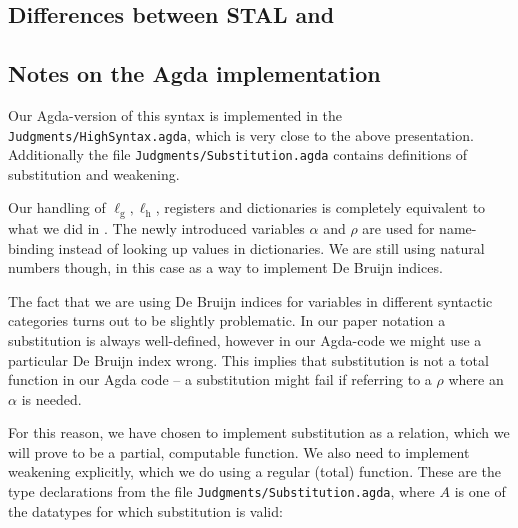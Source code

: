 \subsection{Differences between STAL and \ATAL}
\label{sec:rel-stal}


\subsection{Notes on the Agda implementation}

Our Agda-version of this syntax is implemented in the
\texttt{Judgments/HighSyntax.agda}, which is very close to the above
presentation. Additionally the file \texttt{Judgments/Substitution.agda}
contains definitions of substitution and weakening.

Our handling of $\ell_{\mathrm{g}}, \ell_{\mathrm{h}}$, registers and
dictionaries is completely equivalent to what we did in \ATALe. The newly
introduced variables $\alpha$ and $\rho$ are used for name-binding instead of
looking up values in dictionaries. We are still using natural numbers though, in
this case as a way to implement De Bruijn indices.

The fact that we are using De Bruijn indices for variables in different
syntactic categories turns out to be slightly problematic. In our paper notation
a substitution is always well-defined, however in our Agda-code we might use a
particular De Bruijn index wrong. This implies that substitution is not a total
function in our Agda code -- a substitution might fail if referring to a $\rho$
where an $\alpha$ is needed.

For this reason, we have chosen to implement substitution as a relation, which
we will prove to be a partial, computable function. We also need to implement
weakening explicitly, which we do using a regular (total) function. These are
the type declarations from the file \texttt{Judgments/Substitution.agda}, where
$A$ is one of the datatypes for which substitution is valid:

\begin{code}
\>[2]\<[4]%
\>[4] \AgdaSymbol{:}       \<%
\\
\>[2]\<[4]%
\>[4] \AgdaSymbol{:}         \<%
\end{code}

